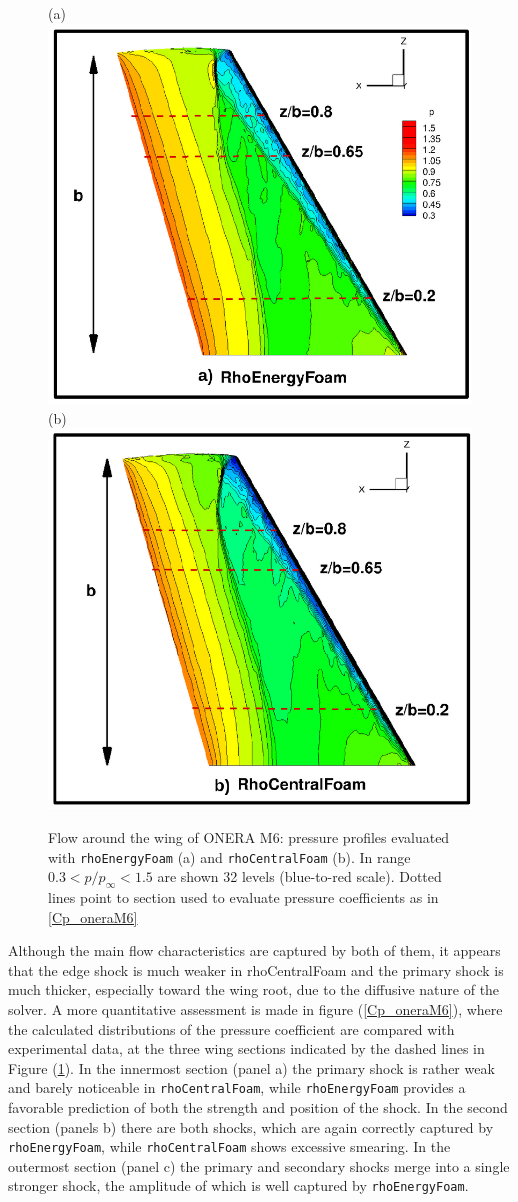\documentclass[a5paper]{sapthesis}
\begin{document}
	\begin{figure}[t]
		\centering
		(a)\includegraphics[width=0.45\linewidth]{Figures/Cp_contours_oneram6_ref}
		(b)\includegraphics[width=0.45\linewidth]{Figures/Cp_contours_oneram6_rcf}
		\caption[Pressure field of a flow around Onera M6 wing]{Flow around the wing of ONERA M6: pressure profiles evaluated with \texttt{rhoEnergyFoam} (a) and \texttt{rhoCentralFoam} (b). In range $0.3 < p/p_\infty < 1.5$ are shown 32 levels  (blue-to-red scale). Dotted lines point to section used to evaluate pressure coefficients as in \ref{Cp_oneraM6}}
		\label{Cp_contours_oneraM6}
	\end{figure}
	
	 \noindent Although the main ﬂow characteristics are captured by both of them, it appears that the edge shock is much weaker in rhoCentralFoam and the primary shock is much thicker, especially toward the wing root, due to the diffusive nature of the solver. A more quantitative assessment is made in figure (\ref{Cp_oneraM6}), where the calculated distributions of the pressure coefficient are compared with \citet{schmitt1979pressure} experimental data, at the three wing sections indicated by the dashed lines in Figure (\ref{Cp_contours_oneraM6}). In the innermost section (panel a) the primary shock is rather weak and barely noticeable in \texttt{rhoCentralFoam}, while \texttt{rhoEnergyFoam} provides a favorable prediction of both the strength and position of the shock. In the second section (panels b) there are both shocks, which are again correctly captured by \texttt{rhoEnergyFoam}, while \texttt{rhoCentralFoam} shows excessive smearing. In the outermost section (panel c) the primary and secondary shocks merge into a single stronger shock, the amplitude of which is well captured by \texttt{rhoEnergyFoam}. 
	
\end{document}
